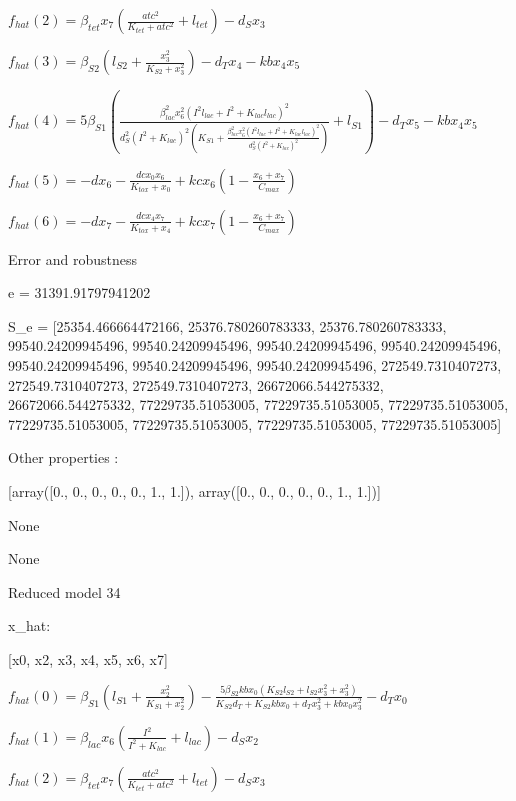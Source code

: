 $f_{hat}(2)=\beta_{tet} x_{7} \left(\frac{atc^{2}}{K_{tet} + atc^{2}} + l_{tet}\right) - d_{S} x_{3}$


$f_{hat}(3)=\beta_{S2} \left(l_{S2} + \frac{x_{3}^{2}}{K_{S2} + x_{3}^{2}}\right) - d_{T} x_{4} - kb x_{4} x_{5}$


$f_{hat}(4)=5 \beta_{S1} \left(\frac{\beta_{lac}^{2} x_{6}^{2} \left(I^{2} l_{lac} + I^{2} + K_{lac} l_{lac}\right)^{2}}{d_{S}^{2} \left(I^{2} + K_{lac}\right)^{2} \left(K_{S1} + \frac{\beta_{lac}^{2} x_{6}^{2} \left(I^{2} l_{lac} + I^{2} + K_{lac} l_{lac}\right)^{2}}{d_{S}^{2} \left(I^{2} + K_{lac}\right)^{2}}\right)} + l_{S1}\right) - d_{T} x_{5} - kb x_{4} x_{5}$


$f_{hat}(5)=- d x_{6} - \frac{dc x_{0} x_{6}}{K_{tox} + x_{0}} + kc x_{6} \left(1 - \frac{x_{6} + x_{7}}{C_{max}}\right)$


$f_{hat}(6)=- d x_{7} - \frac{dc x_{4} x_{7}}{K_{tox} + x_{4}} + kc x_{7} \left(1 - \frac{x_{6} + x_{7}}{C_{max}}\right)$



Error and robustness 


e = 31391.91797941202

S_e = [25354.466664472166, 25376.780260783333, 25376.780260783333, 99540.24209945496, 99540.24209945496, 99540.24209945496, 99540.24209945496, 99540.24209945496, 99540.24209945496, 99540.24209945496, 272549.7310407273, 272549.7310407273, 272549.7310407273, 26672066.544275332, 26672066.544275332, 77229735.51053005, 77229735.51053005, 77229735.51053005, 77229735.51053005, 77229735.51053005, 77229735.51053005, 77229735.51053005]

Other properties :


[array([0., 0., 0., 0., 0., 1., 1.]), array([0., 0., 0., 0., 0., 1., 1.])]

None

None

Reduced model 34

x_{hat}: 

[x0, x2, x3, x4, x5, x6, x7]


$f_{hat}(0)=\beta_{S1} \left(l_{S1} + \frac{x_{2}^{2}}{K_{S1} + x_{2}^{2}}\right) - \frac{5 \beta_{S2} kb x_{0} \left(K_{S2} l_{S2} + l_{S2} x_{3}^{2} + x_{3}^{2}\right)}{K_{S2} d_{T} + K_{S2} kb x_{0} + d_{T} x_{3}^{2} + kb x_{0} x_{3}^{2}} - d_{T} x_{0}$


$f_{hat}(1)=\beta_{lac} x_{6} \left(\frac{I^{2}}{I^{2} + K_{lac}} + l_{lac}\right) - d_{S} x_{2}$


$f_{hat}(2)=\beta_{tet} x_{7} \left(\frac{atc^{2}}{K_{tet} + atc^{2}} + l_{tet}\right) - d_{S} x_{3}$


